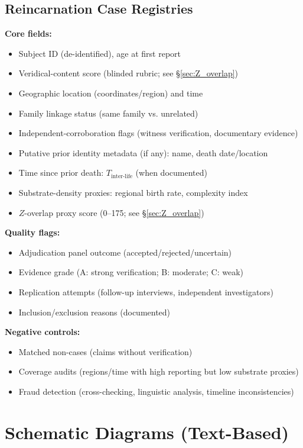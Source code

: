 \documentclass[11pt,letterpaper]{article}
\theoremstyle{definition}
\theoremstyle{remark}
\begin{document}
\subsection{Reincarnation Case Registries}

\textbf{Core fields:}
\begin{itemize}
  \item Subject ID (de-identified), age at first report
  \item Veridical-content score (blinded rubric; see §\ref{sec:Z_overlap})
  \item Geographic location (coordinates/region) and time
  \item Family linkage status (same family vs. unrelated)
  \item Independent-corroboration flags (witness verification, documentary evidence)
  \item Putative prior identity metadata (if any): name, death date/location
  \item Time since prior death: \(T_{\text{inter-life}}\) (when documented)
  \item Substrate-density proxies: regional birth rate, complexity index
  \item \(Z\)-overlap proxy score (0--175; see §\ref{sec:Z_overlap})
\end{itemize}

\textbf{Quality flags:}
\begin{itemize}
  \item Adjudication panel outcome (accepted/rejected/uncertain)
  \item Evidence grade (A: strong verification; B: moderate; C: weak)
  \item Replication attempts (follow-up interviews, independent investigators)
  \item Inclusion/exclusion reasons (documented)
\end{itemize}

\textbf{Negative controls:}
\begin{itemize}
  \item Matched non-cases (claims without verification)
  \item Coverage audits (regions/time with high reporting but low substrate proxies)
  \item Fraud detection (cross-checking, linguistic analysis, timeline inconsistencies)
\end{itemize}

\section{Schematic Diagrams (Text-Based)}\label{app:figures}
\end{document}
